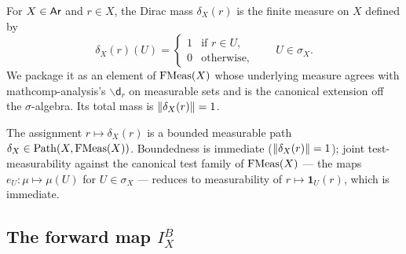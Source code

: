 \begin{definition}%
\label{def:dirac-fmeas}\rocqok\mathcompok
{}%
For $X \in \mathsf{Ar}$ and $r \in X$, the Dirac mass $\delta_X(r)$ is the
finite measure on $X$ defined by
\[
  \delta_X(r)(U) =
    \begin{cases}
      1 & \text{if } r \in U,\\
      0 & \text{otherwise,}
    \end{cases}
  \qquad U \in \sigma_X.
\]
We package it as an element of $\mathrm{FMeas}(X)$ whose underlying measure
agrees with mathcomp-analysis's $\backslash\mathsf{d}_r$ on
measurable sets and is the canonical extension off the
$\sigma$-algebra. Its total mass is $\lVert \delta_X(r) \rVert = 1$.
\end{definition}

\begin{lemma}\label{lem:dirac-path}%
\rocqok\mathcompok
{}%
The assignment $r \mapsto \delta_X(r)$ is a bounded measurable path
$\delta_X \in \mathrm{Path}(X, \mathrm{FMeas}(X))$. Boundedness is immediate
($\lVert \delta_X(r) \rVert = 1$); joint test-measurability against the
canonical test family of $\mathrm{FMeas}(X)$ --- the maps
$e_U \colon \mu \mapsto \mu(U)$ for $U \in \sigma_X$ --- reduces to
measurability of $r \mapsto \mathbf{1}_U(r)$, which is immediate.
\end{lemma}

\subsection{The forward map \texorpdfstring{$I^B_X$}{I^B_X}}\label{sec:int-to-linhom}

